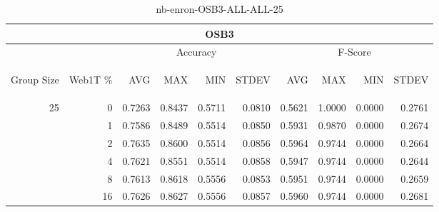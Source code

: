 \begin{center}
\begin{table}[htbp]
\begin{tabular}{ | r | r | r | r | r | r | r | r | r | r |}
\hline
\multicolumn{10}{|c|}{OSB3}\\
\hline
 & & \multicolumn{4}{|c|}{Accuracy} & \multicolumn{4}{|c|}{F-Score}\\ \cline{3-10}
\begin{sideways}Group Size\end{sideways} & \begin{sideways}Web1T \%\end{sideways} & \begin{sideways}AVG\end{sideways} & \begin{sideways}MAX\end{sideways} & \begin{sideways}MIN\end{sideways} & \begin{sideways}STDEV\end{sideways} & \begin{sideways}AVG\end{sideways} & \begin{sideways}MAX\end{sideways} & \begin{sideways}MIN\end{sideways} & \begin{sideways}STDEV\end{sideways}\\
\hline
\multirow{6}{*}{25}
 & 0 & 0.7263 & 0.8437 & 0.5711 & 0.0810 & 0.5621 & 1.0000 & 0.0000 & 0.2761\\ \cline{2-10}
 & 1 & 0.7586 & 0.8489 & 0.5514 & 0.0850 & 0.5931 & 0.9870 & 0.0000 & 0.2674\\ \cline{2-10}
 & 2 & 0.7635 & 0.8600 & 0.5514 & 0.0856 & 0.5964 & 0.9744 & 0.0000 & 0.2664\\ \cline{2-10}
 & 4 & 0.7621 & 0.8551 & 0.5514 & 0.0858 & 0.5947 & 0.9744 & 0.0000 & 0.2644\\ \cline{2-10}
 & 8 & 0.7613 & 0.8618 & 0.5556 & 0.0853 & 0.5951 & 0.9744 & 0.0000 & 0.2659\\ \cline{2-10}
 & 16 & 0.7626 & 0.8627 & 0.5556 & 0.0857 & 0.5960 & 0.9744 & 0.0000 & 0.2681\\ \cline{2-10}
\hline
\end{tabular}
\caption{nb-enron-OSB3-ALL-ALL-25}
\end{table}
\end{center}

